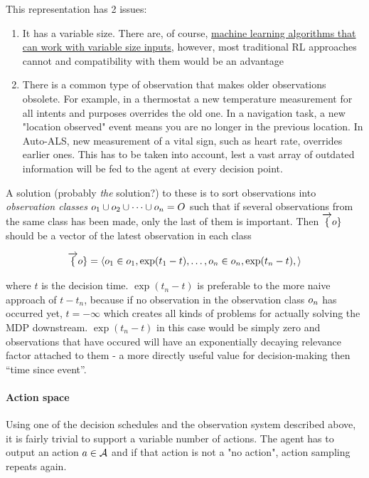 This representation has 2 issues: 
\begin{enumerate}
    \item It has a variable size. There are, of course, \href{https://www.bioinf.jku.at/publications/older/2604.pdf}{machine
learning algorithms that can work with variable size inputs}, however,
most traditional RL approaches cannot and compatibility with them would
be an advantage
    \item There is a common type of observation that makes older
observations obsolete. For example, in a thermostat a new temperature measurement for all intents and purposes overrides the old one. In a navigation task, a new "location observed" event means you are no longer in the previous location. In Auto-ALS, new measurement of a vital sign, such as heart rate, overrides earlier ones. This has to be taken into account, lest a vast array of outdated information will be fed to the agent at every decision point.
\end{enumerate}

A solution (probably \emph{the} solution?) to these is to sort observations into \emph{observation classes} $o_1 \cup o_2 \cup \dots
\cup o_n = O$ such that if several observations from the same class has been made, only the last of them is important. Then $\overrightarrow\{o\}$ should
be a vector of the latest observation in each class

\begin{equation} \overrightarrow\{o\} =
\langle o_1 \in o_1,
\exp(t_1-t), \dots, o_n \in
o_n, \exp(t_n-t), \rangle
\end{equation}

where $t$ is the decision time.
$\exp(t_n-t)$ is preferable
to the more naive approach of $t-t_n$,
because if no observation in the observation class
$o_n$ has occurred yet,
$t=-\infty$ which creates all
kinds of problems for actually solving the MDP downstream.
$\exp(t_n-t)$ in this case
would be simply zero and observations that have occured will have an
exponentially decaying relevance factor attached to them - a more
directly useful value for decision-making then ``time since event''.

\paragraph{Action space}

Using one of the decision schedules and the observation system described above, it is fairly trivial to support a variable number of actions. 
The agent has to output an action $a \in \mathcal{A}$ and if that action is not a "no action", action sampling repeats again.

